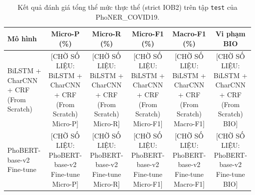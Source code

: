 \begin{table}[t]
\centering
\small
\begin{tabular}{lccccc}
\hline
\textbf{Mô hình} & \textbf{Micro-P (\%)} & \textbf{Micro-R (\%)} & \textbf{Micro-F1 (\%)} & \textbf{Macro-F1 (\%)} & \textbf{Vi phạm BIO} \\
\hline
BiLSTM + CharCNN + CRF (From Scratch) & [CHỜ SỐ LIỆU: BiLSTM + CharCNN + CRF (From Scratch) Micro-P] & [CHỜ SỐ LIỆU: BiLSTM + CharCNN + CRF (From Scratch) Micro-R] & [CHỜ SỐ LIỆU: BiLSTM + CharCNN + CRF (From Scratch) Micro-F1] & [CHỜ SỐ LIỆU: BiLSTM + CharCNN + CRF (From Scratch) Macro-F1] & [CHỜ SỐ LIỆU: BiLSTM + CharCNN + CRF (From Scratch) BIO] \\
PhoBERT-base-v2 Fine-tune & [CHỜ SỐ LIỆU: PhoBERT-base-v2 Fine-tune Micro-P] & [CHỜ SỐ LIỆU: PhoBERT-base-v2 Fine-tune Micro-R] & [CHỜ SỐ LIỆU: PhoBERT-base-v2 Fine-tune Micro-F1] & [CHỜ SỐ LIỆU: PhoBERT-base-v2 Fine-tune Macro-F1] & [CHỜ SỐ LIỆU: PhoBERT-base-v2 Fine-tune BIO] \\
\hline
\end{tabular}
\caption{Kết quả đánh giá tổng thể mức thực thể (strict IOB2) trên tập \texttt{test} của PhoNER\_COVID19.}
\label{tab:main_results}
\end{table}
